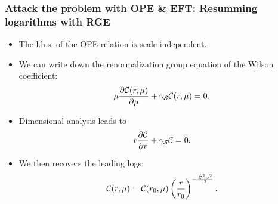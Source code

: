 \begin{frame}
	\frametitle{Attack the problem with OPE \& EFT: Resumming logarithms with RGE} 

	\begin{itemize}
		\item The l.h.s. of the OPE relation is scale independent.
		\item We can write down the renormalization group equation of the Wilson coefficient: 
		\begin{align}
			\mu {\partial {\cal C}(r,\mu)\over \partial \mu}+  \gamma_{\mathcal S} {\cal C}(r,\mu) = 0,
			\label{RGE:cal:C:r:mu}
		\end{align}
		\item Dimensional analysis leads to 
		\begin{align}
			r {\partial {\cal C} \over \partial r}+ \gamma_{\mathcal S} {\cal C} = 0.
			\label{RGE:cal:C:r:kappa}
		\end{align}
		\item We then recovers the leading logs: 
		\begin{align}
			{\cal C}(r,\mu) = {\cal C}(r_0,\mu) \left({r\over r_0}\right)^{-{Z^2\alpha^2\over 2}}.
			\label{RGE:cal:C:r}
		\end{align}

	\end{itemize}

\end{frame}

